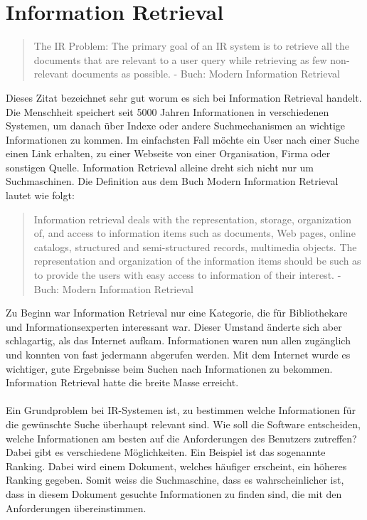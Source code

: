 \documentclass[12pt,a4paper,ngerman]{report}
\begin{document}
\section{Information Retrieval}
\begin{quote}
The IR Problem: The primary goal of an IR system is to retrieve all the documents that are relevant to a user query while retrieving as few non-relevant documents as possible. - Buch: Modern Information Retrieval
\end{quote}
Dieses Zitat bezeichnet sehr gut worum es sich bei Information Retrieval handelt. Die Menschheit speichert seit 5000 Jahren Informationen in verschiedenen Systemen, um danach über Indexe oder andere Suchmechanismen an wichtige Informationen zu kommen. Im einfachsten Fall möchte ein User nach einer Suche einen Link erhalten, zu einer Webseite von einer Organisation, Firma oder sonstigen Quelle. Information Retrieval alleine dreht sich nicht nur um Suchmaschinen. Die Definition aus dem Buch Modern Information Retrieval lautet wie folgt:
\begin{quote}
Information retrieval deals with the representation, storage, organization of, and access to information items such as documents, Web pages, online catalogs, structured and semi-structured records, multimedia objects. The representation and organization of the information items should be such as to provide the users with easy access to information of their interest. - Buch: Modern Information Retrieval
\end{quote}
Zu Beginn war Information Retrieval nur eine Kategorie, die für Bibliothekare und Informationsexperten interessant war. Dieser Umstand änderte sich aber schlagartig, als das Internet aufkam. Informationen waren nun allen zugänglich und konnten von fast jedermann abgerufen werden. Mit dem Internet wurde es wichtiger, gute Ergebnisse beim Suchen nach Informationen zu bekommen. Information Retrieval hatte die breite Masse erreicht.\\
\\
Ein Grundproblem bei IR-Systemen ist, zu bestimmen welche Informationen für die gewünschte Suche überhaupt relevant sind. Wie soll die Software entscheiden, welche Informationen am besten auf die Anforderungen des Benutzers zutreffen? Dabei gibt es verschiedene Möglichkeiten. Ein Beispiel ist das sogenannte Ranking. Dabei wird einem Dokument, welches häufiger erscheint, ein höheres Ranking gegeben. Somit weiss die Suchmaschine, dass es wahrscheinlicher ist, dass in diesem Dokument gesuchte Informationen zu finden sind, die mit den Anforderungen übereinstimmen.\\
\end{document}
